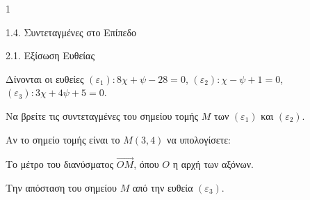 \begin{ylh}{1}
    \item 1.4. Συντεταγμένες στο Επίπεδο
    \item 2.1. Εξίσωση Ευθείας
\end{ylh}
Δίνονται οι ευθείες $(\varepsilon_1) : 8\chi+\psi-28=0$, $(\varepsilon_2) : \chi-\psi+1=0$, $(\varepsilon_3) : 3\chi+4\psi+5=0$.
\begin{alist}
\item Να βρείτε τις συντεταγμένες του σημείου τομής $M$ των $(\varepsilon_1)$ και $(\varepsilon_2)$. 
\item Αν το σημείο τομής είναι το $M(3,4)$ να υπολογίσετε:
    \begin{rlist}
    \item Το μέτρο του διανύσματος $\overrightarrow{OM}$, όπου $O$ η αρχή των αξόνων. 
    \item Την απόσταση του σημείου $M$ από την ευθεία $(\varepsilon_3)$. 
    \end{rlist}
\end{alist}